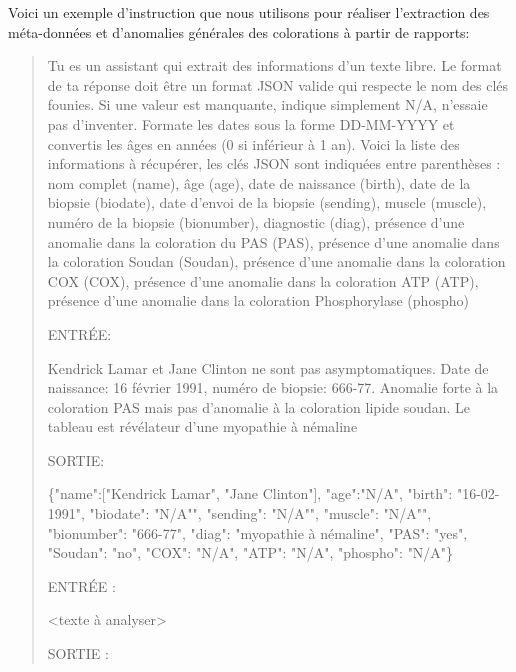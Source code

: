 Voici un exemple d'instruction que nous utilisons pour réaliser l'extraction des méta-données et d'anomalies générales des colorations à partir de rapports:
\begin{quote}
Tu es un assistant qui extrait des informations d'un texte libre. Le format de ta réponse doit être un format JSON valide qui respecte le nom des clés founies. Si une valeur est manquante, indique simplement N/A, n'essaie pas d'inventer. Formate les dates sous la forme DD-MM-YYYY et convertis les âges en années (0 si inférieur à 1 an). Voici la liste des informations à récupérer, les clés JSON sont indiquées entre parenthèses : nom complet (name), âge (age), date de naissance (birth), date de la biopsie (biodate), date d'envoi de la biopsie (sending), muscle (muscle), numéro de la biopsie (bionumber), diagnostic (diag), présence d'une anomalie dans la coloration du PAS (PAS), présence d'une anomalie dans la coloration Soudan (Soudan), présence d'une anomalie dans la coloration COX (COX), présence d'une anomalie dans la coloration ATP (ATP), présence d'une anomalie dans la coloration Phosphorylase (phospho)

ENTRÉE:

Kendrick Lamar et Jane Clinton ne sont pas asymptomatiques. Date de naissance: 16 février 1991, numéro de biopsie: 666-77. Anomalie forte à la coloration PAS mais pas d'anomalie à la coloration lipide soudan. Le tableau est révélateur d'une myopathie à némaline

SORTIE:

\{"name":["Kendrick Lamar", "Jane Clinton"], "age":"N/A", "birth": "16-02-1991", "biodate": "N/A"", "sending": "N/A"", "muscle": "N/A"", "bionumber": "666-77", "diag": "myopathie à némaline", "PAS": "yes", "Soudan": "no", "COX": "N/A", "ATP": "N/A", "phospho": "N/A"\}

ENTRÉE :

<texte à analyser>

SORTIE :
\end{quote}

